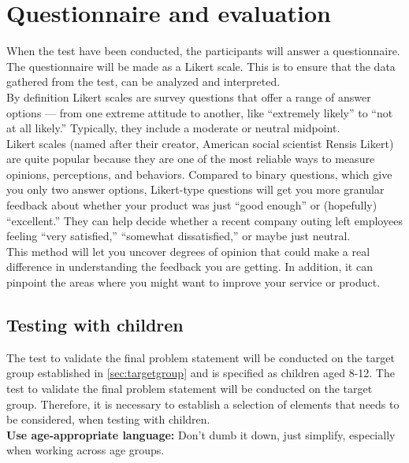 \section{Questionnaire and evaluation}
When the test have been conducted, the participants will answer a questionnaire. The questionnaire will be made as a Likert scale. This is to ensure that the data gathered from the test, can be analyzed and interpreted\cite{likertScale}.\\

By definition Likert scales are survey questions that offer a range of answer options — from one extreme attitude to another, like “extremely likely” to “not at all likely.” Typically, they include a moderate or neutral midpoint\cite{likertScale}.\\


Likert scales (named after their creator, American social scientist Rensis Likert) are quite popular because they are one of the most reliable ways to measure opinions, perceptions, and behaviors.
Compared to binary questions, which give you only two answer options, Likert-type questions will get you more granular feedback about whether your product was just “good enough” or (hopefully) “excellent.” They can help decide whether a recent company outing left employees feeling “very satisfied,” “somewhat dissatisfied,” or maybe just neutral\cite{likertScale}.\\


This method will let you uncover degrees of opinion that could make a real difference in understanding the feedback you are getting. In addition, it can pinpoint the areas where you might want to improve your service or product\cite{likertScale}.\\

\subsection{Testing with children}
The test to validate the final problem statement will be conducted on the target group established in \autoref{sec:targetgroup} and is specified as children aged 8-12. The test to validate the final problem statement will be conducted on the target group. Therefore, it is necessary to establish a selection of elements that needs to be considered, when testing with children.\\

\textbf{Use age-appropriate language:} Don’t dumb it down, just simplify, especially when working across age groups\cite{testwithkids}.\\

